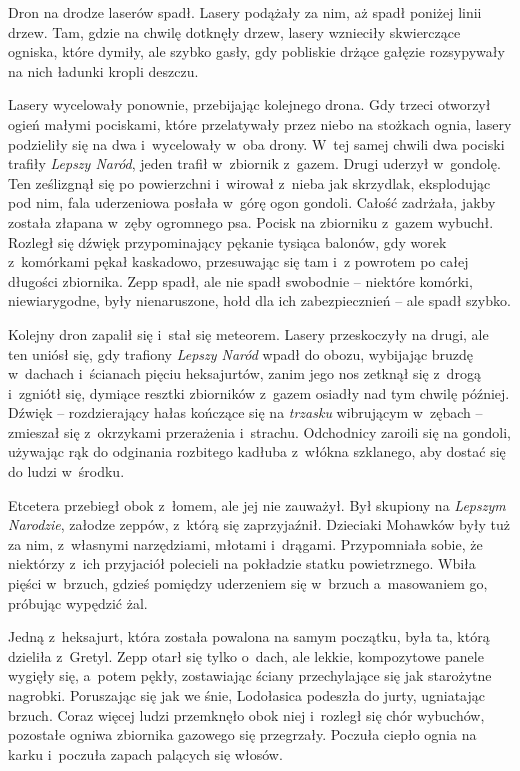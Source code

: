 \documentclass[oneside,polish,11pt,sfheadings]{mwbk}
\begin{document}
Dron na drodze laserów spadł. Lasery podążały za nim, aż spadł poniżej
linii drzew. Tam, gdzie na chwilę dotknęły drzew, lasery wznieciły
skwierczące ogniska, które dymiły, ale szybko gasły, gdy pobliskie
drżące gałęzie rozsypywały na nich ładunki kropli deszczu.

Lasery wycelowały ponownie, przebijając kolejnego drona. Gdy trzeci
otworzył ogień małymi pociskami, które przelatywały przez niebo na
stożkach ognia, lasery podzieliły się na dwa i~wycelowały w~oba drony. W~tej samej chwili dwa pociski trafiły \textit{Lepszy Naród}, jeden trafił w~zbiornik z~gazem. Drugi uderzył w~gondolę. Ten ześlizgnął się po
powierzchni i~wirował z~nieba jak skrzydlak, eksplodując pod nim, fala
uderzeniowa posłała w~górę ogon gondoli. Całość zadrżała, jakby została
złapana w~zęby ogromnego psa. Pocisk na zbiorniku z~gazem wybuchł.
Rozległ się dźwięk przypominający pękanie tysiąca balonów, gdy worek z~komórkami pękał kaskadowo, przesuwając się tam i~z powrotem po całej
długości zbiornika. Zepp spadł, ale nie spadł swobodnie -- niektóre
komórki, niewiarygodne, były nienaruszone, hołd dla ich zabezpiecznień -- ale spadł szybko.

Kolejny dron zapalił się i~stał się meteorem. Lasery przeskoczyły na
drugi, ale ten uniósł się, gdy trafiony \textit{Lepszy Naród} wpadł do
obozu, wybijając bruzdę w~dachach i~ścianach pięciu heksajurtów, zanim
jego nos zetknął się z~drogą i~zgniótł się, dymiące resztki zbiorników z~gazem osiadły nad tym chwilę później. Dźwięk -- rozdzierający hałas
kończące się na \textit{trzasku} wibrującym w~zębach -- zmieszał się z~okrzykami przerażenia i~strachu. Odchodnicy zaroili się na gondoli,
używając rąk do odginania rozbitego kadłuba z~włókna szklanego, aby
dostać się do ludzi w~środku.

Etcetera przebiegł obok z~łomem, ale jej nie zauważył. Był skupiony na
\textit{Lepszym Narodzie}, załodze zeppów, z~którą się zaprzyjaźnił.
Dzieciaki Mohawków były tuż za nim, z~własnymi narzędziami, młotami i~drągami. Przypomniała sobie, że niektórzy z~ich przyjaciół polecieli na
pokładzie statku powietrznego. Wbiła pięści w~brzuch, gdzieś pomiędzy
uderzeniem się w~brzuch a~masowaniem go, próbując wypędzić żal.

Jedną z~heksajurt, która została powalona na samym początku, była ta,
którą dzieliła z~Gretyl. Zepp otarł się tylko o~dach, ale lekkie,
kompozytowe panele wygięły się, a~potem pękły, zostawiając ściany
przechylające się jak starożytne nagrobki. Poruszając się jak we śnie,
Lodołasica podeszła do jurty, ugniatając brzuch. Coraz więcej ludzi
przemknęło obok niej i~rozległ się chór wybuchów, pozostałe ogniwa
zbiornika gazowego się przegrzały. Poczuła ciepło ognia na karku i~poczuła zapach palących się włosów.
\end{document}
